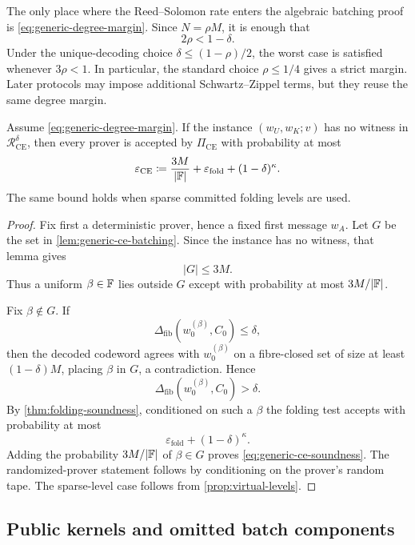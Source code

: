 \begin{remark}
\label{rem:generic-degree-margin}
The only place where the Reed--Solomon rate enters the algebraic batching proof is \eqref{eq:generic-degree-margin}.  Since $N=\rho M$, it is enough that
\[
  2\rho<1-\delta.
\]
Under the unique-decoding choice $\delta\le(1-\rho)/2$, the worst case is satisfied whenever $3\rho<1$.  In particular, the standard choice $\rho\le1/4$ gives a strict margin.  Later protocols may impose additional Schwartz--Zippel terms, but they reuse the same degree margin.
\end{remark}

\begin{theorem}
\label{thm:generic-ce-soundness}
Assume \eqref{eq:generic-degree-margin}.  If the instance $(w_U,w_K;v)$ has no witness in $\mathcal R^{\delta}_{\mathrm{CE}}$, then every prover is accepted by $\Pi_{\mathrm{CE}}$ with probability at most
\begin{equation}
  \varepsilon_{\mathrm{CE}}
  \coloneqq
  \frac{3M}{|\mathbb{F}|}
  +\varepsilon_{\mathrm{fold}}
  +(1-\delta)^\kappa.
  \label{eq:generic-ce-soundness}
\end{equation}
The same bound holds when sparse committed folding levels are used.
\end{theorem}

\begin{proof}
Fix first a deterministic prover, hence a fixed first message $w_A$.  Let $G$ be the set in \cref{lem:generic-ce-batching}.  Since the instance has no witness, that lemma gives
\[
  |G|\le3M.
\]
Thus a uniform $\beta\in\mathbb{F}$ lies outside $G$ except with probability at most $3M/|\mathbb{F}|$.

Fix $\beta\notin G$.  If
\[
  \Delta_{\mathrm{fib}}(w_0^{(\beta)},C_0)\le\delta,
\]
then the decoded codeword agrees with $w_0^{(\beta)}$ on a fibre-closed set of size at least $(1-\delta)M$, placing $\beta$ in $G$, a contradiction.  Hence
\[
  \Delta_{\mathrm{fib}}(w_0^{(\beta)},C_0)>\delta.
\]
By \cref{thm:folding-soundness}, conditioned on such a $\beta$ the folding test accepts with probability at most
\[
  \varepsilon_{\mathrm{fold}}+(1-\delta)^\kappa.
\]
Adding the probability $3M/|\mathbb{F}|$ of $\beta\in G$ proves \eqref{eq:generic-ce-soundness}.  The randomized-prover statement follows by conditioning on the prover's random tape.  The sparse-level case follows from \cref{prop:virtual-levels}.
\end{proof}

\subsection{Public kernels and omitted batch components}
\label{sec:generic-public-kernels}

